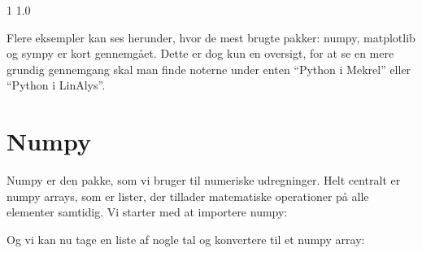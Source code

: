 \documentclass[letterpaper,10pt,english]{jupyterBook}
\begin{document}
\begin{sphinxVerbatim}[commandchars=\\\{\}]
\PYGZhy{}1
\PYGZhy{}1.0
\end{sphinxVerbatim}

\begin{sphinxVerbatim}[commandchars=\\\{\}]
      
  
 
\end{sphinxVerbatim}

\noindent{}

Flere eksempler kan ses  herunder, hvor de mest brugte pakker: numpy, matplotlib og sympy er kort gennemgået. Dette er dog kun en oversigt, for at se en mere grundig gennemgang skal man finde noterne under enten “Python i Mekrel” eller “Python i LinAlys”.


\section{Numpy}
\label{\detokenize{notebooks/Intro_til_pakker:numpy}}
Numpy er den pakke, som vi bruger til numeriske udregninger. Helt centralt er numpy arrays, som er lister, der tillader matematiske operationer på alle elementer samtidig. Vi starter med at importere numpy:

\begin{sphinxVerbatim}[commandchars=\\\{\}]
   
\end{sphinxVerbatim}

Og vi kan nu tage en liste af nogle tal og konvertere til et numpy array:

\begin{sphinxVerbatim}[commandchars=\\\{\}]
  \PYG{p}{[}    \PYG{p}{]}
\end{sphinxVerbatim}
\end{document}
